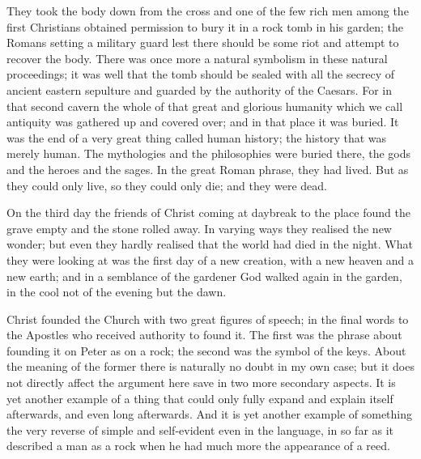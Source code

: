 They took the body down from the cross and one of the few rich men among the first Christians obtained permission to bury it in a rock tomb in his garden; the Romans setting a military guard lest there should be some riot and attempt to recover the body. There was once more a natural symbolism in these natural proceedings; it was well that the tomb should be sealed with all the secrecy of ancient eastern sepulture and guarded by the authority of the Caesars. For in that second cavern the whole of that great and glorious humanity which we call antiquity was gathered up and covered over; and in that place it was buried. It was the end of a very great thing called human history; the history that was merely human. The mythologies and the philosophies were buried there, the gods and the heroes and the sages. In the great Roman phrase, they had lived. But as they could only live, so they could only die; and they were dead.

On the third day the friends of Christ coming at daybreak to the place found the grave empty and the stone rolled away. In varying ways they realised the new wonder; but even they hardly realised that the world had died in the night. What they were looking at was the first day of a new creation, with a new heaven and a new earth; and in a semblance of the gardener God walked again in the garden, in the cool not of the evening but the dawn.


Christ founded the Church with two great figures of speech; in the final words to the Apostles who received authority to found it. The first was the phrase about founding it on Peter as on a rock; the second was the symbol of the keys. About the meaning of the former there is naturally no doubt in my own case; but it does not directly affect the argument here save in two more secondary aspects. It is yet another example of a thing that could only fully expand and explain itself afterwards, and even long afterwards. And it is yet another example of something the very reverse of simple and self-evident even in the language, in so far as it described a man as a rock when he had much more the appearance of a reed.

